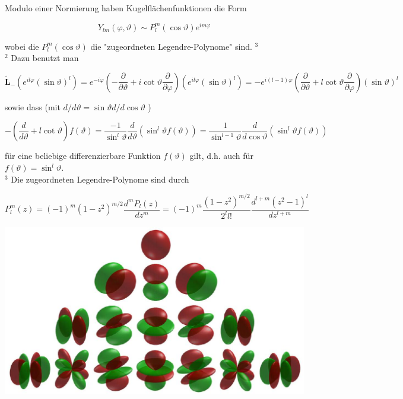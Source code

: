 \documentclass[10pt, letterpaper]{article}
\begin{document}
Modulo einer Normierung haben Kugelflächenfunktionen die Form

$$
Y_{l m}(\varphi, \vartheta) \sim P_{l}^{m}(\cos \vartheta) e^{i m \varphi}
$$

wobei die $P_{l}^{m}(\cos \vartheta)$ die "zugeordneten Legendre-Polynome" sind. ${ }^{3}$\\
${ }^{2}$ Dazu benutzt man

$$
\tilde{\mathbf{L}}_{-}\left(e^{i l \varphi}(\sin \vartheta)^{l}\right)=e^{-i \varphi}\left(-\frac{\partial}{\partial \vartheta}+i \cot \vartheta \frac{\partial}{\partial \varphi}\right)\left(e^{i l \varphi}(\sin \vartheta)^{l}\right)=-e^{i(l-1) \varphi}\left(\frac{\partial}{\partial \vartheta}+l \cot \vartheta \frac{\partial}{\partial \varphi}\right)(\sin \vartheta)^{l}
$$

sowie dass (mit $d / d \vartheta=\sin \vartheta d / d \cos \vartheta$ )

$$
-\left(\frac{d}{d \vartheta}+l \cot \vartheta\right) f(\vartheta)=\frac{-1}{\sin ^{l} \vartheta} \frac{d}{d \vartheta}\left(\sin ^{l} \vartheta f(\vartheta)\right)=\frac{1}{\sin ^{l-1} \vartheta} \frac{d}{d \cos \vartheta}\left(\sin ^{l} \vartheta f(\vartheta)\right)
$$

für eine beliebige differenzierbare Funktion $f(\vartheta)$ gilt, d.h. auch für $f(\vartheta)=\sin ^{l} \vartheta$.\\
${ }^{3}$ Die zugeordneten Legendre-Polynome sind durch

$$
P_{l}^{m}(z)=(-1)^{m}\left(1-z^{2}\right)^{m / 2} \frac{d^{m} P_{l}(z)}{d z^{m}}=(-1)^{m} \frac{\left(1-z^{2}\right)^{m / 2}}{2^{l} l!} \frac{d^{l+m}\left(z^{2}-1\right)^{l}}{d z^{l+m}}
$$

\begin{center}
\includegraphics[scale=0.2]{2025_05_21_5017aafc65fbb33f9443g-12}
\end{center}
\end{document}
